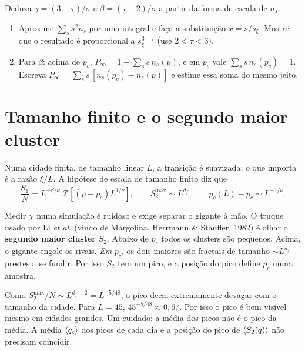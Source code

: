 \documentclass[11pt]{article}
\begin{document}
 Deduza $\gamma = (3-\tau)/\sigma$ e $\beta = (\tau-2)/\sigma$ a partir da forma de escala de $n_s$.
\begin{enumerate}
  \item Aproxime $\sum_s s^2 n_s$ por uma integral e faça a substituição $x = s/s_\xi$. Mostre que o resultado é proporcional a $s_\xi^{3-\tau}$ (use $2<\tau<3$).
  \item Para $\beta$: acima de $p_c$, $P_\infty = 1 - \sum_s s\,n_s(p)$, e em $p_c$ vale $\sum_s s\,n_s(p_c) = 1$. Escreva $P_\infty = \sum_s s\,[n_s(p_c) - n_s(p)]$ e estime essa soma do mesmo jeito.
\end{enumerate}

\section{Tamanho finito e o segundo maior cluster}

Numa cidade finita, de tamanho linear $L$, a transição é suavizada: o que importa é a razão $\xi/L$. A hipótese de escala de tamanho finito diz que
\[
\frac{S_1}{N} = L^{-\beta/\nu}\,\mathcal{F}\!\left[(p-p_c)L^{1/\nu}\right],
\qquad S_2^{\max}\sim L^{d_f},
\qquad p_c(L)-p_c \sim L^{-1/\nu}.
\]

\begin{ideia}
Medir $\chi$ numa simulação é ruidoso e exige separar o gigante à mão. O truque usado por Li \emph{et al.} (vindo de Margolina, Herrmann \& Stauffer, 1982) é olhar o \textbf{segundo maior cluster} $S_2$. Abaixo de $p_c$ todos os clusters são pequenos. Acima, o gigante engole os rivais. \emph{Em} $p_c$, os dois maiores são fractais de tamanho $\sim L^{d_f}$ prestes a se fundir. Por isso $S_2$ tem um pico, e a posição do pico define $p_c$ numa amostra.
\end{ideia}

Como $S_2^{\max}/N \sim L^{d_f-2} = L^{-5/48}$, o pico decai extremamente devagar com o tamanho da cidade. Para $L=45$, $45^{-5/48}\approx 0{,}67$. Por isso o pico é bem visível mesmo em cidades grandes. Um cuidado: a média dos picos não é o pico da média. A média $\left\langle q_c \right\rangle$ dos picos de cada dia e a posição do pico de $\left\langle S_2(q) \right\rangle$ não precisam coincidir.
\end{document}
